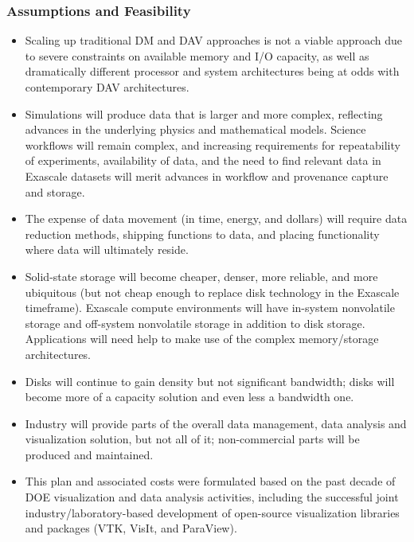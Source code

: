 \subsubsection{Assumptions and Feasibility}
\begin{itemize}
\item Scaling up traditional DM and DAV approaches is not a viable approach due to severe constraints on available memory and I/O capacity, as well as dramatically different processor and system architectures being at odds with contemporary DAV architectures.
\item Simulations will produce data that is larger and more complex, reflecting advances in the underlying physics and mathematical models. Science workflows will remain complex, and increasing requirements for repeatability of experiments, availability of data, and the need to find relevant data in Exascale datasets will merit advances in workflow and provenance capture and storage.
\item The expense of data movement (in time, energy, and dollars) will require data reduction methods, shipping functions to data, and placing functionality where data will ultimately reside.
\item Solid-state storage will become cheaper, denser, more reliable, and more ubiquitous (but not cheap enough to replace disk technology in the Exascale timeframe). Exascale compute environments will have in-system nonvolatile storage and off-system nonvolatile storage in addition to disk storage. Applications will need help to make use of the complex memory/storage architectures.
\item Disks will continue to gain density but not significant bandwidth; disks will become more of a capacity solution and even less a bandwidth one.
\item Industry will provide parts of the overall data management, data analysis and visualization solution, but not all of it; non-commercial parts will be produced and maintained.
\item This plan and associated costs were formulated based on the past decade of DOE visualization and data analysis activities, including the successful joint industry/laboratory-based development of open-source visualization libraries and packages (VTK, VisIt, and ParaView).
\end{itemize}
